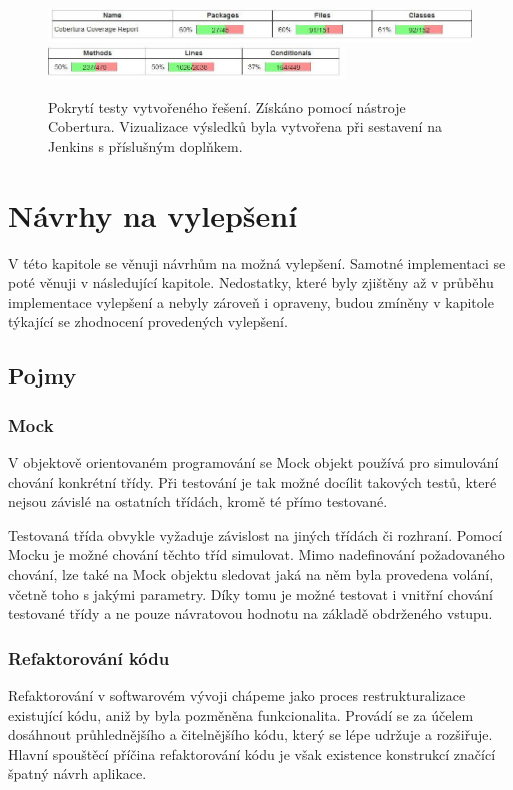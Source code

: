 \documentclass[thesis=B,czech]{FITthesis}[2012/06/26]
\begin{document}
\begin{figure}[h]\centering
 	\includegraphics[width=1.0\textwidth]{resources/cobertura-report-old-1}
 	\includegraphics[width=0.7\textwidth]{resources/cobertura-report-old-2}
	\caption[Pokrytí testy vytvořeného řešení]{Pokrytí testy vytvořeného řešení. Získáno pomocí nástroje Cobertura. Vizualizace
	výsledků byla vytvořena při sestavení na Jenkins s příslušným doplňkem.}\label{fig:cober-old}
\end{figure}


\chapter{Návrhy na vylepšení}
V této kapitole se věnuji návrhům na možná vylepšení. Samotné implementaci se poté věnuji v následující kapitole. 
Nedostatky, které byly zjištěny až v průběhu implementace vylepšení a nebyly zároveň i opraveny, budou zmíněny v kapitole týkající se zhodnocení
provedených vylepšení.

\section{Pojmy}

\subsection{Mock}
V objektově orientovaném programování se Mock objekt používá pro simulování chování konkrétní třídy.\cite{mock}
Při testování je tak možné docílit takových testů, které nejsou závislé na ostatních třídách, kromě té přímo testované.
\par
Testovaná třída obvykle vyžaduje závislost na jiných třídách či rozhraní. Pomocí Mocku je možné chování těchto tříd simulovat.
Mimo nadefinování požadovaného chování, lze také na Mock objektu sledovat jaká na něm byla provedena volání, včetně toho
s jakými parametry. Díky tomu je možné testovat i vnitřní chování testované třídy a ne pouze návratovou hodnotu na základě 
obdrženého vstupu.\cite{mock}

\subsection{Refaktorování kódu}
Refaktorování v softwarovém vývoji chápeme jako proces restrukturalizace existující kódu, aniž by byla 
pozměněna funkcionalita. Provádí se za účelem dosáhnout průhlednějšího a čitelnějšího kódu, který
se lépe udržuje a rozšiřuje. \cite{refaktoring} Hlavní spouštěcí příčina refaktorování kódu je však existence 
konstrukcí značící špatný návrh aplikace. 
\end{document}
